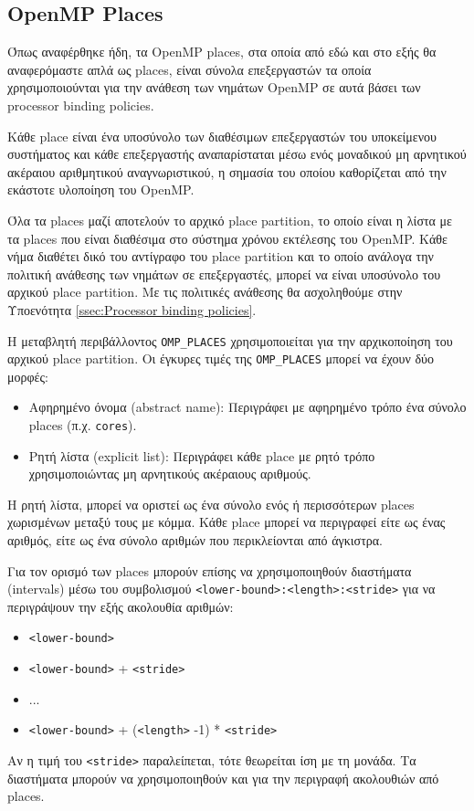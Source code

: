 \subsection{OpenMP Places}
Όπως αναφέρθηκε ήδη, τα OpenMP places, στα οποία από εδώ και στο εξής θα αναφερόμαστε απλά ως places, είναι σύνολα επεξεργαστών τα οποία χρησιμοποιούνται για την ανάθεση των νημάτων OpenMP σε αυτά βάσει των processor binding policies.

Κάθε place είναι ένα υποσύνολο των διαθέσιμων επεξεργαστών του υποκείμενου συστήματος και κάθε επεξεργαστής αναπαρίσταται μέσω ενός μοναδικού μη αρνητικού ακέραιου αριθμητικού αναγνωριστικού, η σημασία του οποίου καθορίζεται από την εκάστοτε υλοποίηση του OpenMP.

Όλα τα places μαζί αποτελούν το αρχικό place partition, το οποίο είναι η λίστα με τα places που είναι διαθέσιμα στο σύστημα χρόνου εκτέλεσης του OpenMP. Κάθε νήμα διαθέτει δικό του αντίγραφο του place partition και το οποίο ανάλογα την πολιτική ανάθεσης των νημάτων σε επεξεργαστές, μπορεί να είναι υποσύνολο του αρχικού place partition. Με τις πολιτικές ανάθεσης θα ασχοληθούμε στην Υποενότητα \ref{ssec:Processor binding policies}.

Η μεταβλητή περιβάλλοντος \texttt{OMP\_PLACES} χρησιμοποιείται για την αρχικοποίηση του αρχικού place partition. Οι έγκυρες τιμές της \texttt{OMP\_PLACES} μπορεί να έχουν δύο μορφές:
\begin{itemize}
	\item Αφηρημένο όνομα (abstract name): Περιγράφει με αφηρημένο τρόπο ένα σύνολο places (π.χ. \texttt{cores}).
	\item Ρητή λίστα (explicit list): Περιγράφει κάθε place με ρητό τρόπο χρησιμοποιώντας μη αρνητικούς ακέραιους αριθμούς.
\end{itemize}

Η ρητή λίστα, μπορεί να οριστεί ως ένα σύνολο ενός ή περισσότερων places χωρισμένων μεταξύ τους με κόμμα. Κάθε place μπορεί να περιγραφεί είτε ως ένας αριθμός, είτε ως ένα σύνολο αριθμών που περικλείονται από άγκιστρα.

Για τον ορισμό των places μπορούν επίσης να χρησιμοποιηθούν διαστήματα (intervals) μέσω του συμβολισμού \texttt{<lower-bound>:<length>:<stride>} για να περιγράψουν την εξής ακολουθία αριθμών:
\begin{itemize}
	\item \texttt{<lower-bound>}
	\item \texttt{<lower-bound>} + \texttt{<stride>}
	\item ...
	\item \texttt{<lower-bound>} + (\texttt{<length>} -1) * \texttt{<stride>}
\end{itemize}
Αν η τιμή του \texttt{<stride>} παραλείπεται, τότε θεωρείται ίση με τη μονάδα. Τα διαστήματα μπορούν να χρησιμοποιηθούν και για την περιγραφή ακολουθιών από places.


